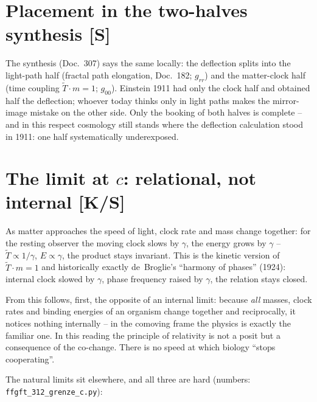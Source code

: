 \section{Placement in the two-halves synthesis [S]}

The synthesis (Doc.~307) says the same locally: the deflection
splits into the light-path half (fractal path elongation,
Doc.~182; $g_{rr}$) and the matter-clock half (time coupling
$\tilde T \cdot m = 1$; $g_{00}$). Einstein 1911 had only the
clock half and obtained half the deflection; whoever today thinks
only in light paths makes the mirror-image mistake on the other
side. Only the booking of both halves is complete -- and in this
respect cosmology still stands where the deflection calculation
stood in 1911: one half systematically underexposed.

\section{The limit at $c$: relational, not internal [K/S]}

As matter approaches the speed of light, clock rate and mass change
together: for the resting observer the moving clock slows by
$\gamma$, the energy grows by $\gamma$ --
$\tilde T \propto 1/\gamma$, $E \propto \gamma$, the product stays
invariant. This is the kinetic version of $\tilde T \cdot m = 1$
and historically exactly de~Broglie's \enquote{harmony of phases}
(1924): internal clock slowed by $\gamma$, phase frequency raised
by $\gamma$, the relation stays closed.

From this follows, first, the opposite of an internal limit:
because \emph{all} masses, clock rates and binding energies of an
organism change together and reciprocally, it notices nothing
internally -- in the comoving frame the physics is exactly the
familiar one. In this reading the principle of relativity is not a
posit but a consequence of the co-change. There is no speed at
which biology \enquote{stops cooperating}.

The natural limits sit elsewhere, and all three are hard (numbers:
\texttt{ffgft\_312\_grenze\_c.py}):

